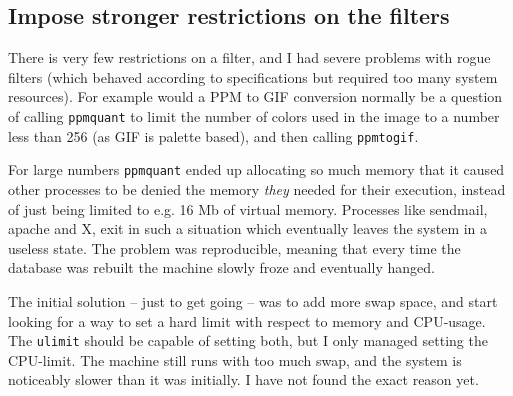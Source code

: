 \subsection*{Impose stronger restrictions on the filters}

There is very few restrictions on a filter, and I had severe problems
with rogue filters (which behaved according to specifications but
required too many system resources).  For example would a PPM to GIF
conversion normally be a question of calling \texttt{ppmquant} to
limit the number of colors used in the image to a number less than 256
(as GIF is palette based), and then calling \texttt{ppmtogif}.

For large numbers \texttt{ppmquant} ended up allocating so much memory
that it caused other processes to be denied the memory \textit{they}
needed for their execution, instead of just being limited to e.g. 16
Mb of virtual memory.  Processes like sendmail, apache and X, 
exit in such a situation which eventually leaves the system in a
useless state.  The problem was reproducible, meaning that every time
the database was rebuilt the machine slowly froze and eventually hanged.

The initial solution -- just to get going -- was to add more swap
space, and start looking for a way to set a hard limit with respect to
memory and CPU-usage.  The \texttt{ulimit} should be capable of
setting both, but I only managed setting the CPU-limit.  The machine
still runs with too much swap, and the system is noticeably slower than
it was initially.    I have not found the exact reason yet. 















